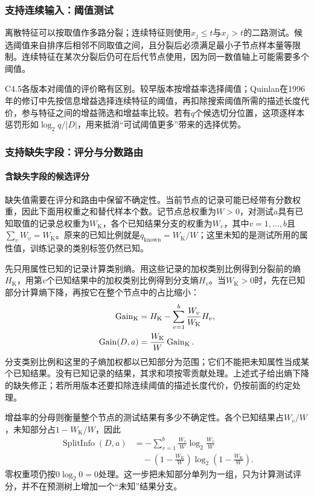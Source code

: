 \subsubsection{支持连续输入：阈值测试}
离散特征可以按取值作多路分裂；连续特征则使用$x_j\leq t$与$x_j>t$的二路测试。候选阈值来自排序后相邻不同取值之间，且分裂后必须满足最小子节点样本量等限制。连续特征在某次分裂后仍可在后代节点使用，因为同一数值轴上可能需要多个阈值。

C4.5各版本对阈值的评价略有区别。较早版本按增益率选择阈值；Quinlan在1996年的修订中先按信息增益选择连续特征的阈值，再扣除搜索阈值所需的描述长度代价，参与特征之间的增益筛选和增益率比较。若有$q$个候选切分位置，这项逐样本惩罚形如$\log_2 q/|D|$，用来抵消“可试阈值更多”带来的选择优势。

\subsubsection{支持缺失字段：评分与分数路由}

\paragraph{含缺失字段的候选评分}
缺失值需要在评分和路由中保留不确定性。当前节点的记录可能已经带有分数权重，因此下面用权重之和替代样本个数。记节点总权重为$W>0$，对测试$a$具有已知取值的记录总权重为$W_{\mathrm K}$，各个已知结果分支的权重为$W_v$，其中$v=1,\ldots,b$且$\sum_vW_v=W_{\mathrm K}$。原来的已知比例就是$q_{\mathrm{known}}=W_{\mathrm K}/W$；这里未知的是测试所用的属性值，训练记录的类别标签仍然已知。

先只用属性已知的记录计算类别熵。用这些记录的加权类别比例得到分裂前的熵$H_{\mathrm K}$，用第$v$个已知结果中的加权类别比例得到分支熵$H_v$。当$W_{\mathrm K}>0$时，先在已知部分计算熵下降，再按它在整个节点中的占比缩小：
\begin{align}
  \operatorname{Gain}_{\mathrm K}
    &=H_{\mathrm K}-\sum_{v=1}^b
        \frac{W_v}{W_{\mathrm K}}H_v,\notag\\
  \operatorname{Gain}(D,a)
    &=\frac{W_{\mathrm K}}{W}\operatorname{Gain}_{\mathrm K}.
  \label{eq:classification-c45-missing-gain}
\end{align}
分支类别比例和这里的子熵加权都以已知部分为范围；它们不能把未知属性当成某个已知结果。没有已知记录的结果，其求和项按零贡献处理。上述式子给出熵下降的缺失修正；若所用版本还要扣除连续阈值的描述长度代价，仍按前面的约定处理。

增益率的分母则衡量整个节点的测试结果有多少不确定性。各个已知结果占$W_v/W$，未知部分占$1-W_{\mathrm K}/W$，因此
\begin{equation}
  \begin{aligned}
    \operatorname{SplitInfo}(D,a)
      &=-\sum_{v=1}^b\frac{W_v}{W}
          \log_2\frac{W_v}{W}\\
      &\quad-\left(1-\frac{W_{\mathrm K}}{W}\right)
          \log_2\left(1-\frac{W_{\mathrm K}}{W}\right).
  \end{aligned}
  \label{eq:classification-c45-missing-split-info}
\end{equation}
零权重项仍按$0\log_2 0=0$处理。这一步把未知部分单列为一组，只为计算测试评分，并不在预测树上增加一个“未知”结果分支。

